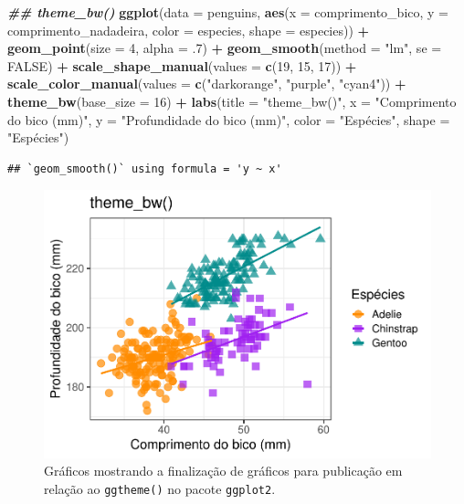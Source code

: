 \documentclass[
]{article}
\newenvironment{Shaded}{\begin{snugshade}}{\end{snugshade}}
\newcommand{\AttributeTok}[1]{\textcolor[rgb]{0.13,0.29,0.53}{#1}}
\newcommand{\ConstantTok}[1]{\textcolor[rgb]{0.56,0.35,0.01}{#1}}
\newcommand{\DecValTok}[1]{\textcolor[rgb]{0.00,0.00,0.81}{#1}}
\newcommand{\DocumentationTok}[1]{\textcolor[rgb]{0.56,0.35,0.01}{\textbf{\textit{#1}}}}
\newcommand{\FunctionTok}[1]{\textcolor[rgb]{0.13,0.29,0.53}{\textbf{#1}}}
\newcommand{\NormalTok}[1]{#1}
\newcommand{\SpecialCharTok}[1]{\textcolor[rgb]{0.81,0.36,0.00}{\textbf{#1}}}
\newcommand{\StringTok}[1]{\textcolor[rgb]{0.31,0.60,0.02}{#1}}
\begin{document}
\begin{Shaded}
\begin{Highlighting}[]
\DocumentationTok{\#\# theme\_bw()}
\FunctionTok{ggplot}\NormalTok{(}\AttributeTok{data =}\NormalTok{ penguins, }
       \FunctionTok{aes}\NormalTok{(}\AttributeTok{x =}\NormalTok{ comprimento\_bico, }\AttributeTok{y =}\NormalTok{ comprimento\_nadadeira,}
           \AttributeTok{color =}\NormalTok{ especies, }\AttributeTok{shape =}\NormalTok{ especies)) }\SpecialCharTok{+}
    \FunctionTok{geom\_point}\NormalTok{(}\AttributeTok{size =} \DecValTok{4}\NormalTok{, }\AttributeTok{alpha =}\NormalTok{ .}\DecValTok{7}\NormalTok{) }\SpecialCharTok{+}
    \FunctionTok{geom\_smooth}\NormalTok{(}\AttributeTok{method =} \StringTok{"lm"}\NormalTok{, }\AttributeTok{se =} \ConstantTok{FALSE}\NormalTok{) }\SpecialCharTok{+}
    \FunctionTok{scale\_shape\_manual}\NormalTok{(}\AttributeTok{values =} \FunctionTok{c}\NormalTok{(}\DecValTok{19}\NormalTok{, }\DecValTok{15}\NormalTok{, }\DecValTok{17}\NormalTok{)) }\SpecialCharTok{+}
    \FunctionTok{scale\_color\_manual}\NormalTok{(}\AttributeTok{values =} \FunctionTok{c}\NormalTok{(}\StringTok{"darkorange"}\NormalTok{, }\StringTok{"purple"}\NormalTok{, }\StringTok{"cyan4"}\NormalTok{)) }\SpecialCharTok{+}
    \FunctionTok{theme\_bw}\NormalTok{(}\AttributeTok{base\_size =} \DecValTok{16}\NormalTok{) }\SpecialCharTok{+}
    \FunctionTok{labs}\NormalTok{(}\AttributeTok{title =} \StringTok{"theme\_bw()"}\NormalTok{, }\AttributeTok{x =} \StringTok{"Comprimento do bico (mm)"}\NormalTok{,}
         \AttributeTok{y =} \StringTok{"Profundidade do bico (mm)"}\NormalTok{, }\AttributeTok{color =} \StringTok{"Espécies"}\NormalTok{, }\AttributeTok{shape =} \StringTok{"Espécies"}\NormalTok{) }
\end{Highlighting}
\end{Shaded}

\begin{verbatim}
## `geom_smooth()` using formula = 'y ~ x'
\end{verbatim}

\begin{figure}
\centering
\includegraphics{epr_files/figure-latex/fig-plot-final-ggtheme-2.pdf}
\caption{\label{fig:fig-plot-final-ggtheme-2}Gráficos mostrando a finalização de gráficos para publicação em relação ao \texttt{ggtheme()} no pacote \texttt{ggplot2}.}
\end{figure}
\end{document}
